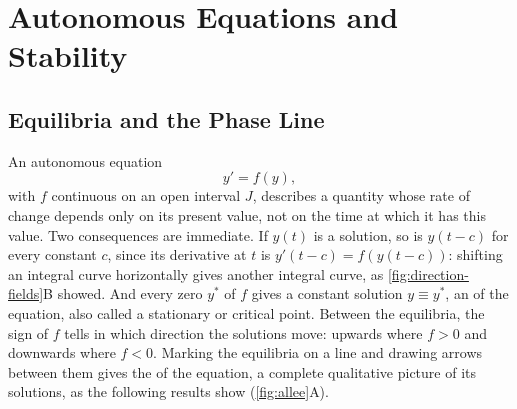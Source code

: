 \section{Autonomous Equations and Stability}
\label{sec:autonomous}

\subsection{Equilibria and the Phase Line}

An autonomous equation
\begin{equation}
y'=f(y),
\label{eq:autonomous}
\end{equation}
with $f$ continuous on an open interval $J$, describes a quantity whose rate of change depends only on its present value, not on the time at which it has this value. Two consequences are immediate. If $y(t)$ is a solution, so is $y(t-c)$ for every constant $c$, since its derivative at $t$ is $y'(t-c)=f(y(t-c))$: shifting an integral curve horizontally gives another integral curve, as \cref{fig:direction-fields}B showed. And every zero $y^*$ of $f$ gives a constant solution $y\equiv y^*$, an  of the equation, also called a stationary or critical point. Between the equilibria, the sign of $f$ tells in which direction the solutions move: upwards where $f>0$ and downwards where $f<0$. Marking the equilibria on a line and drawing arrows between them gives the  of the equation, a complete qualitative picture of its solutions, as the following results show (\cref{fig:allee}A).

